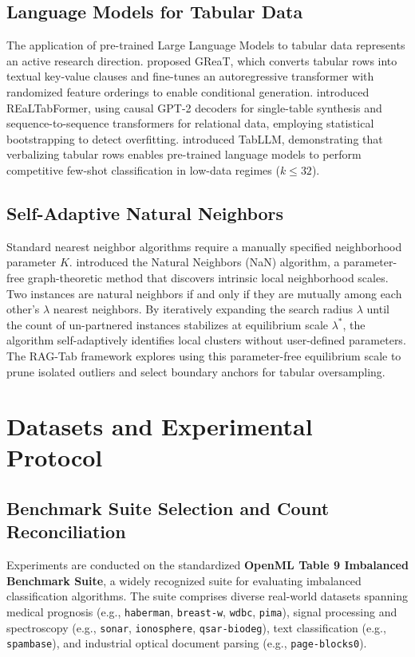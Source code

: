 \documentclass[sn-basic]{sn-jnl}
\begin{document}
\subsection{Language Models for Tabular Data}
The application of pre-trained Large Language Models to tabular data represents an active research direction. \citet{borisov2023language} proposed GReaT, which converts tabular rows into textual key-value clauses and fine-tunes an autoregressive transformer with randomized feature orderings to enable conditional generation. \citet{solatorio2023realtabformer} introduced REaLTabFormer, using causal GPT-2 decoders for single-table synthesis and sequence-to-sequence transformers for relational data, employing statistical bootstrapping to detect overfitting. \citet{hegselmann2023tabllm} introduced TabLLM, demonstrating that verbalizing tabular rows enables pre-trained language models to perform competitive few-shot classification in low-data regimes ($k \le 32$).

\subsection{Self-Adaptive Natural Neighbors}
Standard nearest neighbor algorithms require a manually specified neighborhood parameter $K$. \citet{huang2011natural} introduced the Natural Neighbors (NaN) algorithm, a parameter-free graph-theoretic method that discovers intrinsic local neighborhood scales. Two instances are natural neighbors if and only if they are mutually among each other's $\lambda$ nearest neighbors. By iteratively expanding the search radius $\lambda$ until the count of un-partnered instances stabilizes at equilibrium scale $\lambda^*$, the algorithm self-adaptively identifies local clusters without user-defined parameters. The RAG-Tab framework explores using this parameter-free equilibrium scale to prune isolated outliers and select boundary anchors for tabular oversampling.

\section{Datasets and Experimental Protocol}
\label{sec:datasets_protocol}

\subsection{Benchmark Suite Selection and Count Reconciliation}
Experiments are conducted on the standardized \textbf{OpenML Table 9 Imbalanced Benchmark Suite}, a widely recognized suite for evaluating imbalanced classification algorithms. The suite comprises diverse real-world datasets spanning medical prognosis (e.g., \texttt{haberman}, \texttt{breast-w}, \texttt{wdbc}, \texttt{pima}), signal processing and spectroscopy (e.g., \texttt{sonar}, \texttt{ionosphere}, \texttt{qsar-biodeg}), text classification (e.g., \texttt{spambase}), and industrial optical document parsing (e.g., \texttt{page-blocks0}).
\end{document}
